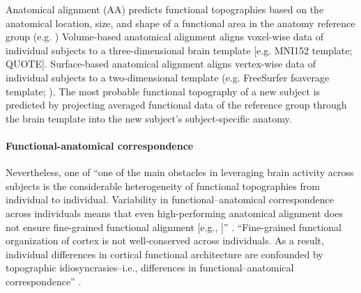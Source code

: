 


Anatomical alignment (AA) predicts functional topographies based on the
anatomical location, size, and shape of a functional area in the anatomy
reference group (e.g. \citet{weiner2018defining})
Volume-based anatomical alignment \citep{evans19933d} aligns voxel-wise data of
individual subjects to a three-dimensional brain template [e.g. MNI152 template;
QUOTE].
Surface-based anatomical alignment \citep{fischl1999cortical}  aligns
vertex-wise data of individual subjects to a two-dimensional template (e.g.
FreeSurfer fsaverage template; \citep{fischl1999high}).
%
The most probable functional topography of a new subject is predicted by
projecting averaged functional data of the reference group through the brain
template into the new subject's subject-specific anatomy.

\paragraph{Functional-anatomical correspondence}

%
Nevertheless, one of ``one of the main obstacles in leveraging brain activity
across subjects is the considerable heterogeneity of functional topographies
from individual to individual. Variability in functional--anatomical
correspondence across individuals means that even high-performing anatomical
alignment does not ensure fine-grained functional alignment [e.g.,
\citet{frost2012measuring}]'' \citep{kumar2020brainiak}.
%
``Fine-grained functional organization of cortex is not well-conserved across
individuals. As a result, individual differences in cortical functional
architecture are confounded by topographic idiosyncrasies--i.e., differences in
functional–anatomical correspondence'' \citep{feilong2018reliable}.

